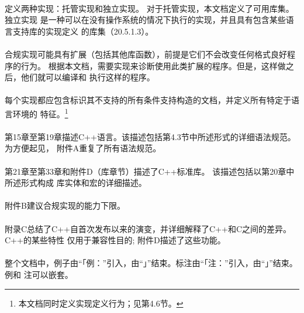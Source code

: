 \paragraph{}
定义两种实现：托管实现和独立实现。 对于托管实现，本文档定义了可用库集。 独立实现
是一种可以在没有操作系统的情况下执行的实现，并且具有包含某些语言支持库的实现定义
的库集（20.5.1.3）。

\paragraph{}
合规实现可能具有扩展（包括其他库函数），前提是它们不会改变任何格式良好程序的行为。
根据本文档，需要实现来诊断使用此类扩展的程序。但是，这样做之后，他们就可以编译和
执行这样的程序。

\paragraph{}
每个实现都应包含标识其不支持的所有条件支持构造的文档，并定义所有特定于语言环境的
特征。\footnote{本文档同时定义实现定义行为；见第4.6节。}

\paragraph{}
第15章至第19章描述C++语言。该描述包括第4.3节中所述形式的详细语法规范。为方便起见，
附件A重复了所有语法规范。

\paragraph{}
第21章至第33章和附件D（库章节）描述了C++标准库。 该描述包括以第20章中所述形式构成
库实体和宏的详细描述。 

\paragraph{}
附件B建议合规实现的能力下限。

\paragraph{}
附录C总结了C++自首次发布以来的演变，并详细解释了C++和C之间的差异。C++的某些特性
仅用于兼容性目的; 附件D描述了这些功能。

\paragraph{}
整个文档中，例子由“「例：”引入，由“」”结束。标注由“「注：”引入，由“」”结束。例和
注可以嵌套。

